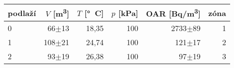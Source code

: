 \begin{tabular}{lrrrrr}
\toprule
podlaží & $V$ [\si{m^3}] & $T$ [\si{\degree C}] & $p$ [kPa] & OAR [\si{Bq/m^3}] & zóna\\
\midrule
0 &        66$\pm$13 &18,35& 100& 2733$\pm$89 &1\\
1 &       108$\pm$21 &24,74& 100& 121$\pm$17 &2\\
2 &        93$\pm$19 &26,38& 100&  97$\pm$19 &3\\
\bottomrule
\end{tabular}
